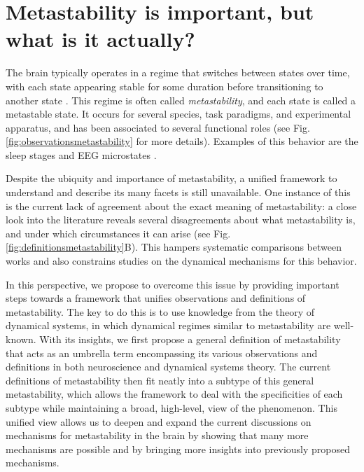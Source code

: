\documentclass[reprint,onecolumn,superscriptaddress,showpacs,amsmath,amssymb,aps,floatfix]{revtex4-2}
\theoremstyle{definition}
\begin{document}
\maketitle

\section{Metastability is important, but what is it actually?}
The brain typically operates in a regime that switches between states over time, with each state appearing stable for some duration before transitioning to another state \cite{michel2017eeg, vandeville2010eeg, lehmann1987eeg, jones2007natural, lacamera2019cortical, mazzucato2019expectation, recanatesi2021metastable, brinkman2022metastable, abeles1995cortical, seidemann1996simultaneously, jercog2017updown, luczak2007sequential, mazor2005transient, sasaki2007metastability, mashour2020conscious, dehaene2005ongoing, hudson2014recovery, tognoli2014metastable, popa2009constracting, curtis2015initiation, fernandez2020sleep}.  This regime is often called \textit{metastability}, and each state is called a metastable state. It occurs for several species, task paradigms, and experimental apparatus, and has been associated to several functional roles (see Fig. \ref{fig:observationsmetastability} for more details). Examples of this behavior are the sleep stages \cite{yetton2018quantifying, fernandez2020sleep} and EEG microstates \cite{michel2017eeg}.

Despite the ubiquity and importance of metastability, a unified framework to understand and describe its many facets is still unavailable. One instance of this is the current lack of agreement about the exact meaning of metastability: a close look into the literature reveals several disagreements about what metastability is, and under which circumstances it can arise (see Fig. \ref{fig:definitionsmetastability}B). This hampers systematic comparisons between works and also constrains studies on the dynamical mechanisms for this behavior. 

In this perspective, we propose to overcome this issue by providing important steps towards a framework that unifies observations and definitions of metastability. The key to do this is to use knowledge from the theory of dynamical systems, in which dynamical regimes similar to metastability are well-known. With its insights, we first propose a general definition of metastability that acts as an umbrella term encompassing its various observations and definitions in both neuroscience and dynamical systems theory. The current definitions of metastability then fit neatly into a subtype of this general metastability, which allows the framework to deal with the specificities of each subtype while maintaining a broad, high-level, view of the phenomenon. This unified view allows us to deepen and expand the current discussions on mechanisms for metastability in the brain by showing that many more mechanisms are possible and by bringing more insights into previously proposed mechanisms. 
\end{document}
